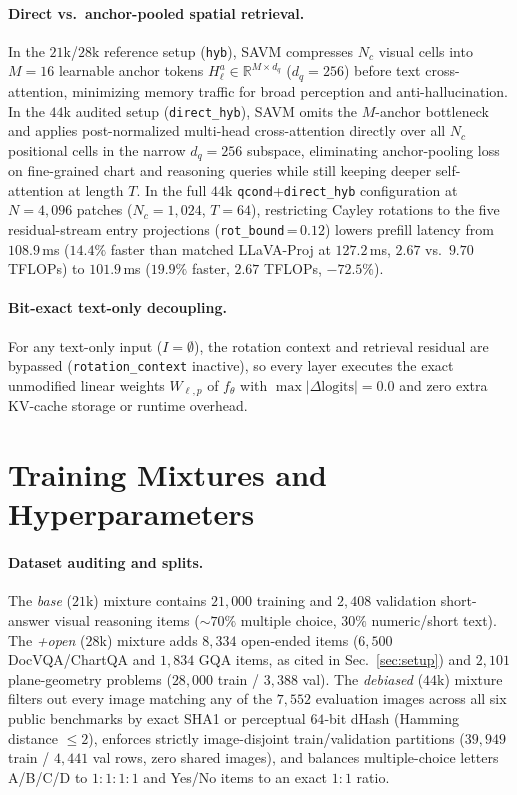 \paragraph{Direct vs.\ anchor-pooled spatial retrieval.}
In the $21$k/$28$k reference setup (\texttt{hyb}), SAVM compresses $N_c$ visual
cells into $M{=}16$ learnable anchor tokens $H_\ell^a\in\mathbb{R}^{M\times d_q}$
($d_q{=}256$) before text cross-attention, minimizing memory traffic for broad
perception and anti-hallucination. In the $44$k audited setup
(\texttt{direct\_hyb}), SAVM omits the $M$-anchor bottleneck and applies
post-normalized multi-head cross-attention directly over all $N_c$ positional
cells in the narrow $d_q{=}256$ subspace, eliminating anchor-pooling loss on
fine-grained chart and reasoning queries while still keeping deeper
self-attention at length $T$. In the full $44$k \texttt{qcond}+\texttt{direct\_hyb}
configuration at $N{=}4{,}096$ patches ($N_c{=}1{,}024$, $T{=}64$), restricting
Cayley rotations to the five residual-stream entry projections
(\texttt{rot\_bound}\,{=}\,$0.12$) lowers prefill latency from $108.9$\,ms
($14.4\%$ faster than matched LLaVA-Proj at $127.2$\,ms, $2.67$ vs.\
$9.70$ TFLOPs) to $101.9$\,ms ($19.9\%$ faster, $2.67$ TFLOPs, $-72.5\%$).

\paragraph{Bit-exact text-only decoupling.}
For any text-only input ($I{=}\emptyset$), the rotation context and retrieval
residual are bypassed (\texttt{rotation\_context} inactive), so every layer
executes the exact unmodified linear weights $W_{\ell,p}$ of $f_\theta$ with
$\max|\Delta\text{logits}|=0.0$ and zero extra KV-cache storage or runtime overhead.

\section{Training Mixtures and Hyperparameters}
\label{sec:supp_data}

\paragraph{Dataset auditing and splits.}
The \emph{base} ($21$k) mixture contains $21{,}000$ training and $2{,}408$
validation short-answer visual reasoning items (${\sim}70\%$ multiple choice,
$30\%$ numeric/short text). The \emph{+open} ($28$k) mixture adds $8{,}334$
open-ended items ($6{,}500$ DocVQA/ChartQA and $1{,}834$ GQA items, as cited in
Sec.~\ref{sec:setup}) and $2{,}101$ plane-geometry problems ($28{,}000$
train / $3{,}388$ val). The \emph{debiased} ($44$k) mixture filters out every
image matching any of the $7{,}552$ evaluation images across all six public
benchmarks by exact SHA1 or perceptual $64$-bit dHash (Hamming distance
${\le}2$), enforces strictly image-disjoint train/validation partitions
($39{,}949$ train / $4{,}441$ val rows, zero shared images), and balances
multiple-choice letters A/B/C/D to $1{:}1{:}1{:}1$ and Yes/No items to an exact $1{:}1$ ratio.

